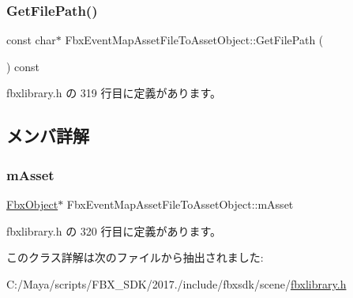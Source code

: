 \subsubsection{\texorpdfstring{Get\+File\+Path()}{GetFilePath()}}
{\footnotesize\ttfamily const char$\ast$ Fbx\+Event\+Map\+Asset\+File\+To\+Asset\+Object\+::\+Get\+File\+Path (\begin{DoxyParamCaption}{ }\end{DoxyParamCaption}) const\hspace{0.3cm}{\ttfamily [inline]}}



 fbxlibrary.\+h の 319 行目に定義があります。



\subsection{メンバ詳解}
\mbox{\label{class_fbx_event_map_asset_file_to_asset_object_a29d3b4f66df038ce5fbf3832a3cd3f31}} 
\subsubsection{\texorpdfstring{m\+Asset}{mAsset}}
{\footnotesize\ttfamily \hyperlink{class_fbx_object}{Fbx\+Object}$\ast$ Fbx\+Event\+Map\+Asset\+File\+To\+Asset\+Object\+::m\+Asset\hspace{0.3cm}{\ttfamily [mutable]}}



 fbxlibrary.\+h の 320 行目に定義があります。



このクラス詳解は次のファイルから抽出されました\+:\begin{DoxyCompactItemize}
\item 
C\+:/\+Maya/scripts/\+F\+B\+X\+\_\+\+S\+D\+K/2017./include/fbxsdk/scene/\hyperlink{fbxlibrary_8h}{fbxlibrary.\+h}\end{DoxyCompactItemize}
